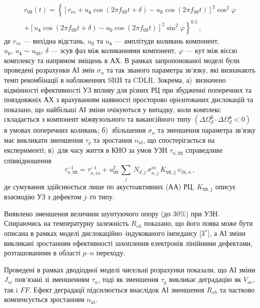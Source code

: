 \begin{multline}
\label{eqrUS}
r_\mathtt{US}(t)=\left\{[r_{in}+u_\mathtt{A}\cos(2\pi f_\mathtt{US}t+\delta)-u_\mathtt{D}\cos(2\pi f_\mathtt{US}t)]^2\cos^2\varphi \right.\\
    \left.+ [u_\mathtt{A}\cos(2\pi f_\mathtt{US}t+\delta)-u_\mathtt{D}\cos(2\pi f_\mathtt{US}t)]^2\sin^2\varphi\right\}^{0.5}\,,
\end{multline}
де
$r_{in}$ --- вихідна відстань,
$u_\mathtt{D}$ та $u_\mathtt{A}$ --- амплітуди коливань компонент, $u_\mathtt{D},\,u_\mathtt{A}\sim u_\mathtt{US}$,
$\delta$ --- зсув фаз між коливаннями компонент,
$\varphi$ --- кут між віссю комплексу та напрямом зміщень в АХ.
В рамках запропонованої моделі були проведені розрахунки АІ змін $\sigma_{n}$ та так званого параметра зв'язку,
які визначають темп рекомбінації в наближеннях SRH та  CDLR.
Зокрема,
а)~визначено відмінності ефективності УЗ впливу для різних РЦ при збудженні поперечних та повздовжніх АХ з врахуванням наявності просторово орієнтованих дислокацій та показано, що найбільші АІ зміни очікуються у випадку, коли комплекс складається з компонент міжвузольного та вакансійного типу $(\Delta\Omega_d^\mathtt{D}\cdot\Delta\Omega_d^\mathtt{A}<0)$
 в умовах поперечних коливань;
б)~збільшення $\sigma_{n}$ та зменшення параметра зв'язку має викликати зменшення $\tau_g$ та зростання $n_\mathrm{id}$, що спостерігається на експерименті;
в)~для часу життя в КНО за умов УЗН $\tau_{n,\mathtt{US}}$ справедливе співвідношення
\begin{equation}
\label{eqEpsSigUSA}
\tau_{n,\mathtt{US}}^{-1}=
\tau_{n,in}^{-1}+u_{\mathtt{US}}^2\,\sum_j\,N_{d,j}\,\sigma_{n,j}^{in}\,K_\mathtt{US,j}\,\upsilon_{\mathrm{th},n}\,,
\end{equation}
де
сумування здійснюється лише по акустоактивних (АА) РЦ,
$K_\mathtt{US,j}$ описує взаємодію УЗ з дефектом $j$--го типу.

Виявлено зменшення величини шунтуючого опору (до 30\%) при УЗН.
Спираючись на температурну залежність $R_{sh}$ показано, що його поява може бути описана в рамках моделі дислокаційно--індукованого імпедансу
[3$^*$], а АІ зміни викликані зростанням ефективності захоплення електронів лінійними дефектами, розташованими в області $p$--$n$ переходу.

Проведені в рамках дводіодної моделі чисельні розрахунки показали, що АІ зміни $J_{sc}$ пов'язані зі зменшенням $\tau_{n}$,
тоді як зменшення $\tau_{g}$ викликає деградацію як $V_{oc}$, так i $F\!F$.
Ефект деградації підсилюється внаслідок АI зменшення $R_{sh}$ та частково компенсується зростанням $n_\mathrm{id}$.


